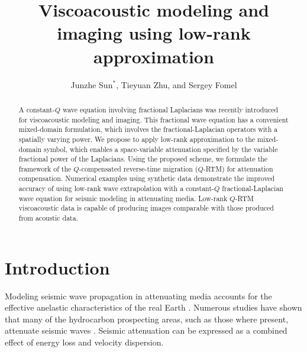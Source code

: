\title{Viscoacoustic modeling and imaging using low-rank approximation}
\author{Junzhe Sun$^*$\footnotemark[1], Tieyuan Zhu\footnotemark[1], and Sergey Fomel\footnotemark[1]}
\maketitle

\address{
\footnotemark[1]Bureau of Economic Geology \\
John A. and Katherine G. Jackson School of Geosciences \\
The University of Texas at Austin \\
University Station, Box X \\
Austin, TX 78713-8924 \\
}


\begin{abstract}
A constant-$Q$ wave equation involving fractional Laplacians was recently introduced for viscoacoustic modeling and imaging. This fractional wave equation has a convenient mixed-domain formulation, which involves the fractional-Laplacian operators with a spatially varying power. We propose to apply low-rank approximation to the mixed-domain symbol, which enables a space-variable attenuation specified by the variable fractional power of the Laplacians. Using the proposed scheme, we formulate the framework of the $Q$-compensated reverse-time migration ($Q$-RTM) for attenuation compensation. Numerical examples using synthetic data demonstrate the improved accuracy of using low-rank wave extrapolation with a constant-$Q$ fractional-Laplacian wave equation for seismic modeling in attenuating media. Low-rank $Q$-RTM  viscoacoustic data is capable of producing images comparable  with those produced from acoustic data.
\end{abstract}

\section{Introduction}
Modeling seismic wave propagation in attenuating media accounts for the effective anelastic characteristics of the real Earth \cite[]{carc07}. Numerous studies have shown that many of the hydrocarbon prospecting areas, such as those where  present,  attenuate seismic waves \cite[]{dvorkin06}. Seismic attenuation can be expressed as a combined effect of energy loss and velocity dispersion. 

